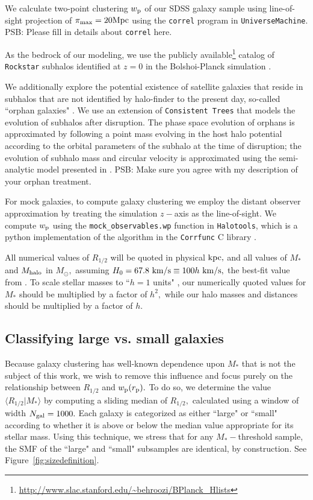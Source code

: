 \documentclass[usenatbib,usegraphicx,letterpaper]{mn2e}
\newcommand{\rhalf}{R_{1/2}}
\newcommand{\mstar}{M_{\ast}}
\newcommand{\mhalo}{M_{\rm halo}}
\newcommand{\rproj}{r_{\rm p}}
\newcommand{\wproj}{w_{\rm p}}
\newcommand{\kpc}{{\rm kpc}}
\newcommand{\mpc}{{\rm Mpc}}
\newcommand{\msun}{M_\odot}
\newcommand{\kms}{{\rm km/s}}
\begin{document}
We calculate two-point clustering $\wproj$ of our SDSS galaxy sample using line-of-sight projection of $\pi_{\rm max}=20\mpc$ using the {\tt correl} program in {\tt UniverseMachine}. {\color{red} PSB: Please fill in details about {\tt correl} here}. 

As the bedrock of our modeling, we use the publicly available\footnote{\url{http://www.slac.stanford.edu/~behroozi/BPlanck\_Hlists}} catalog of {\tt Rockstar} subhalos identified at $z=0$ in the Bolshoi-Planck simulation \citep{klypin_etal11,behroozi12_rockstar,behroozi12_consistent_trees,riebe_etal13,rodriguez_puebla16_bolplanck}. 

We additionally explore the potential existence of satellite galaxies that reside in subhalos that are not identified by halo-finder to the present day, so-called ``orphan galaxies" \citep[see, e.g.,][]{campbell_etal17}. We use an extension of {\tt Consistent Trees} that models the evolution of subhalos after disruption. The phase space evolution of orphans is approximated by following a point mass evolving in the host halo potential according to the orbital parameters of the subhalo at the time of disruption; the evolution of subhalo mass and circular velocity is approximated using the semi-analytic model presented in \citet{jiang_vdB14}. {\color{red} PSB: Make sure you agree with my description of your orphan treatment.} 

For mock galaxies, to compute galaxy clustering we employ the distant observer approximation by treating the simulation $z-$axis as the line-of-sight. We compute $\wproj$ using the {\tt mock\_observables.wp} function in {\tt Halotools}, which is a python implementation of the algorithm in the {\tt Corrfunc} C library \citep{sinha_etal17}.

All numerical values of $\rhalf$ will be quoted in physical $\kpc,$ and all values of $\mstar$ and $\mhalo$ in $\msun,$ assuming $H_0=67.8~\kms\equiv100h~\kms,$ the best-fit value from \citet{planck15}. To scale stellar masses to ``$h=1$ units" \citep{croton13}, our numerically quoted values for $\mstar$ should be multiplied by a factor of $h^2,$ while our halo masses and distances should be multiplied by a factor of $h.$

\subsection{Classifying large vs. small galaxies}
\label{subsec:sizedef}

Because galaxy clustering has well-known dependence upon $\mstar$ that is not the subject of this work, we wish to remove this influence and focus purely on the relationship between $\rhalf$ and $\wproj(\rproj).$ To do so, we determine the value $\langle\rhalf\vert\mstar\rangle$ by computing a sliding median of $\rhalf,$ calculated using a window of width $N_{\rm gal}=1000.$ Each galaxy is categorized as either ``large" or ``small" according to whether it is above or below the median value appropriate for its stellar mass. Using this technique, we stress that for any $\mstar-$threshold sample, the SMF of the ``large" and ``small" subsamples are identical, by construction. See Figure~\ref{fig:sizedefinition}.
\end{document}
